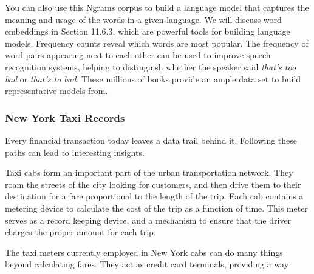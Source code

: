 \documentclass[10pt]{article}
\begin{document}
You can also use this Ngrams corpus to build a language model that captures the meaning and usage of the words in a given language. We will discuss word embeddings in Section 11.6.3, which are powerful tools for building language models. Frequency counts reveal which words are most popular. The frequency of word pairs appearing next to each other can be used to improve speech recognition systems, helping to distinguish whether the speaker said \textit{that's too bad} or \textit{that's to bad}. These millions of books provide an ample data set to build representative models from.

\subsubsection*{New York Taxi Records}
Every financial transaction today leaves a data trail behind it. Following these paths can lead to interesting insights.

Taxi cabs form an important part of the urban transportation network. They roam the streets of the city looking for customers, and then drive them to their destination for a fare proportional to the length of the trip. Each cab contains a metering device to calculate the cost of the trip as a function of time. This meter serves as a record keeping device, and a mechanism to ensure that the driver charges the proper amount for each trip.

The taxi meters currently employed in New York cabs can do many things beyond calculating fares. They act as credit card terminals, providing a way
\end{document}
